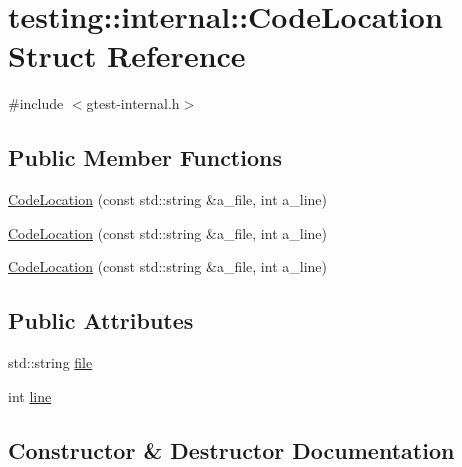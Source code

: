 \hypertarget{structtesting_1_1internal_1_1_code_location}{}\section{testing\+::internal\+::Code\+Location Struct Reference}
\label{structtesting_1_1internal_1_1_code_location}


{\ttfamily \#include $<$gtest-\/internal.\+h$>$}

\subsection*{Public Member Functions}
\begin{DoxyCompactItemize}
\item 
\mbox{\hyperlink{structtesting_1_1internal_1_1_code_location_a323a11851c81629d632c47b9b767b8ac}{Code\+Location}} (const std\+::string \&a\+\_\+file, int a\+\_\+line)
\item 
\mbox{\hyperlink{structtesting_1_1internal_1_1_code_location_a323a11851c81629d632c47b9b767b8ac}{Code\+Location}} (const std\+::string \&a\+\_\+file, int a\+\_\+line)
\item 
\mbox{\hyperlink{structtesting_1_1internal_1_1_code_location_a323a11851c81629d632c47b9b767b8ac}{Code\+Location}} (const std\+::string \&a\+\_\+file, int a\+\_\+line)
\end{DoxyCompactItemize}
\subsection*{Public Attributes}
\begin{DoxyCompactItemize}
\item 
std\+::string \mbox{\hyperlink{structtesting_1_1internal_1_1_code_location_a38118056ad3c11359920274e393bc6b3}{file}}
\item 
int \mbox{\hyperlink{structtesting_1_1internal_1_1_code_location_a01c977c7e8834a05a6d6c40b0c416045}{line}}
\end{DoxyCompactItemize}


\subsection{Constructor \& Destructor Documentation}
\mbox{\label{structtesting_1_1internal_1_1_code_location_a323a11851c81629d632c47b9b767b8ac}} 
